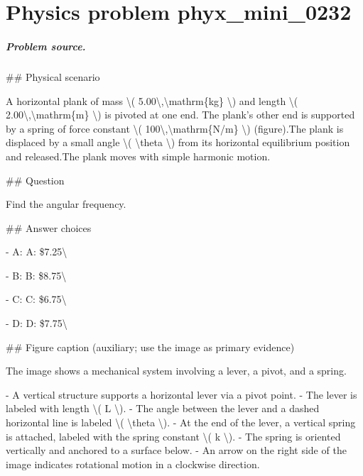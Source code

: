 
\chapter{Physics problem phyx\_mini\_0232}
\label{ch:PhyXMiniProblems_problem_phyx_mini_0232}

\paragraph{Problem source.}
\#\# Physical scenario

A horizontal plank of mass \textbackslash{}( 5.00\textbackslash{},\textbackslash{}mathrm\{kg\} \textbackslash{}) and length \textbackslash{}( 2.00\textbackslash{},\textbackslash{}mathrm\{m\} \textbackslash{}) is pivoted at one end. The plank's other end is supported by a spring of force constant \textbackslash{}( 100\textbackslash{},\textbackslash{}mathrm\{N/m\} \textbackslash{}) (figure).The plank is displaced by a small angle \textbackslash{}( \textbackslash{}theta \textbackslash{}) from its horizontal equilibrium position and released.The plank moves with simple harmonic motion.

\#\# Question

Find the angular frequency.

\#\# Answer choices

- A: A: \$7.25\textbackslash{}

- B: B: \$8.75\textbackslash{}

- C: C: \$6.75\textbackslash{}

- D: D: \$7.75\textbackslash{}

\#\# Figure caption (auxiliary; use the image as primary evidence)

The image shows a mechanical system involving a lever, a pivot, and a spring. 

- A vertical structure supports a horizontal lever via a pivot point. 
- The lever is labeled with length \textbackslash{}( L \textbackslash{}).
- The angle between the lever and a dashed horizontal line is labeled \textbackslash{}( \textbackslash{}theta \textbackslash{}).
- At the end of the lever, a vertical spring is attached, labeled with the spring constant \textbackslash{}( k \textbackslash{}).
- The spring is oriented vertically and anchored to a surface below.
- An arrow on the right side of the image indicates rotational motion in a clockwise direction. 

